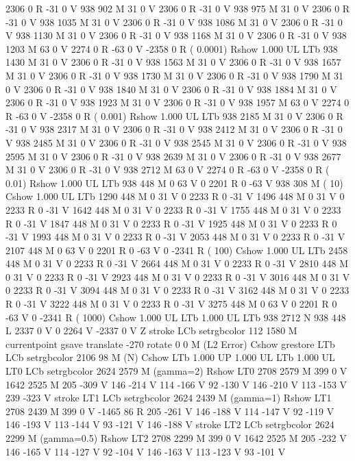 2306 0 R
-31 0 V
938 902 M
31 0 V
2306 0 R
-31 0 V
938 975 M
31 0 V
2306 0 R
-31 0 V
938 1035 M
31 0 V
2306 0 R
-31 0 V
938 1086 M
31 0 V
2306 0 R
-31 0 V
938 1130 M
31 0 V
2306 0 R
-31 0 V
938 1168 M
31 0 V
2306 0 R
-31 0 V
938 1203 M
63 0 V
2274 0 R
-63 0 V
-2358 0 R
( 0.0001) Rshow
1.000 UL
LTb
938 1430 M
31 0 V
2306 0 R
-31 0 V
938 1563 M
31 0 V
2306 0 R
-31 0 V
938 1657 M
31 0 V
2306 0 R
-31 0 V
938 1730 M
31 0 V
2306 0 R
-31 0 V
938 1790 M
31 0 V
2306 0 R
-31 0 V
938 1840 M
31 0 V
2306 0 R
-31 0 V
938 1884 M
31 0 V
2306 0 R
-31 0 V
938 1923 M
31 0 V
2306 0 R
-31 0 V
938 1957 M
63 0 V
2274 0 R
-63 0 V
-2358 0 R
( 0.001) Rshow
1.000 UL
LTb
938 2185 M
31 0 V
2306 0 R
-31 0 V
938 2317 M
31 0 V
2306 0 R
-31 0 V
938 2412 M
31 0 V
2306 0 R
-31 0 V
938 2485 M
31 0 V
2306 0 R
-31 0 V
938 2545 M
31 0 V
2306 0 R
-31 0 V
938 2595 M
31 0 V
2306 0 R
-31 0 V
938 2639 M
31 0 V
2306 0 R
-31 0 V
938 2677 M
31 0 V
2306 0 R
-31 0 V
938 2712 M
63 0 V
2274 0 R
-63 0 V
-2358 0 R
( 0.01) Rshow
1.000 UL
LTb
938 448 M
0 63 V
0 2201 R
0 -63 V
938 308 M
( 10) Cshow
1.000 UL
LTb
1290 448 M
0 31 V
0 2233 R
0 -31 V
1496 448 M
0 31 V
0 2233 R
0 -31 V
1642 448 M
0 31 V
0 2233 R
0 -31 V
1755 448 M
0 31 V
0 2233 R
0 -31 V
1847 448 M
0 31 V
0 2233 R
0 -31 V
1925 448 M
0 31 V
0 2233 R
0 -31 V
1993 448 M
0 31 V
0 2233 R
0 -31 V
2053 448 M
0 31 V
0 2233 R
0 -31 V
2107 448 M
0 63 V
0 2201 R
0 -63 V
0 -2341 R
( 100) Cshow
1.000 UL
LTb
2458 448 M
0 31 V
0 2233 R
0 -31 V
2664 448 M
0 31 V
0 2233 R
0 -31 V
2810 448 M
0 31 V
0 2233 R
0 -31 V
2923 448 M
0 31 V
0 2233 R
0 -31 V
3016 448 M
0 31 V
0 2233 R
0 -31 V
3094 448 M
0 31 V
0 2233 R
0 -31 V
3162 448 M
0 31 V
0 2233 R
0 -31 V
3222 448 M
0 31 V
0 2233 R
0 -31 V
3275 448 M
0 63 V
0 2201 R
0 -63 V
0 -2341 R
( 1000) Cshow
1.000 UL
LTb
1.000 UL
LTb
938 2712 N
938 448 L
2337 0 V
0 2264 V
-2337 0 V
Z stroke
LCb setrgbcolor
112 1580 M
currentpoint gsave translate -270 rotate 0 0 M
(L2 Error) Cshow
grestore
LTb
LCb setrgbcolor
2106 98 M
(N) Cshow
LTb
1.000 UP
1.000 UL
LTb
1.000 UL
LT0
LCb setrgbcolor
2624 2579 M
(gamma=2) Rshow
LT0
2708 2579 M
399 0 V
1642 2525 M
205 -309 V
146 -214 V
114 -166 V
92 -130 V
146 -210 V
113 -153 V
239 -323 V
stroke
LT1
LCb setrgbcolor
2624 2439 M
(gamma=1) Rshow
LT1
2708 2439 M
399 0 V
-1465 86 R
205 -261 V
146 -188 V
114 -147 V
92 -119 V
146 -193 V
113 -144 V
93 -121 V
146 -188 V
stroke
LT2
LCb setrgbcolor
2624 2299 M
(gamma=0.5) Rshow
LT2
2708 2299 M
399 0 V
1642 2525 M
205 -232 V
146 -165 V
114 -127 V
92 -104 V
146 -163 V
113 -123 V
93 -101 V
